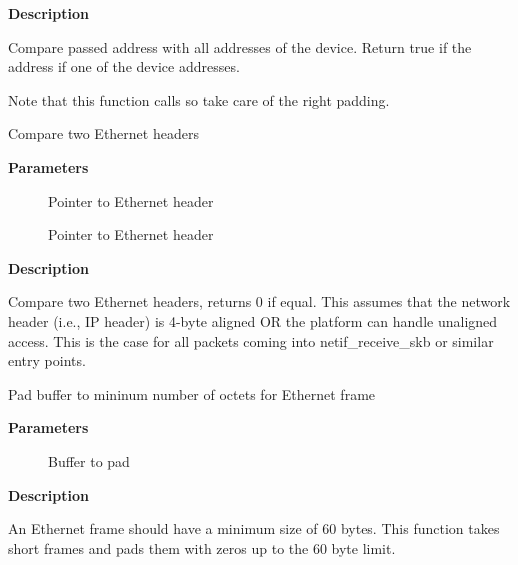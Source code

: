 \documentclass[a4paper,8pt,english]{sphinxmanual}
\begin{document}
\textbf{Description}

Compare passed address with all addresses of the device. Return true if the
address if one of the device addresses.

Note that this function calls {\hyperref[networking/kapi:c.ether_addr_equal_64bits]{\emph{}}} so take care of
the right padding.

\begin{fulllineitems}
\label{networking/kapi:c.compare_ether_header}
Compare two Ethernet headers

\end{fulllineitems}


\textbf{Parameters}
\begin{description}
\item[{}] \leavevmode
Pointer to Ethernet header

\item[{}] \leavevmode
Pointer to Ethernet header

\end{description}

\textbf{Description}

Compare two Ethernet headers, returns 0 if equal.
This assumes that the network header (i.e., IP header) is 4-byte
aligned OR the platform can handle unaligned access.  This is the
case for all packets coming into netif\_receive\_skb or similar
entry points.

\begin{fulllineitems}
\label{networking/kapi:c.eth_skb_pad}
Pad buffer to mininum number of octets for Ethernet frame

\end{fulllineitems}


\textbf{Parameters}
\begin{description}
\item[{}] \leavevmode
Buffer to pad

\end{description}

\textbf{Description}

An Ethernet frame should have a minimum size of 60 bytes.  This function
takes short frames and pads them with zeros up to the 60 byte limit.
\end{document}
